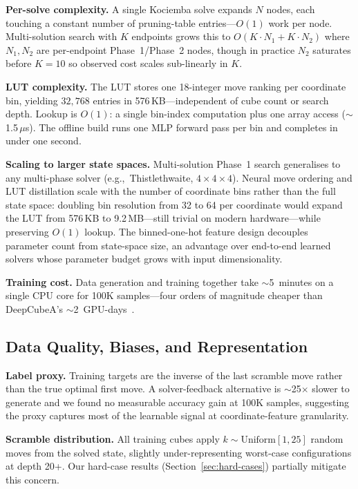 \documentclass[graybox]{svmult}
\begin{document}
\textbf{Per-solve complexity.} A single Kociemba solve expands $N$ nodes, each touching a constant number of pruning-table entries---$O(1)$ work per node. Multi-solution search with $K$ endpoints grows this to $O(K \cdot N_1 + K \cdot N_2)$ where $N_1,N_2$ are per-endpoint Phase~1/Phase~2 nodes, though in practice $N_2$ saturates before $K{=}10$ so observed cost scales sub-linearly in $K$.

\textbf{LUT complexity.} The LUT stores one 18-integer move ranking per coordinate bin, yielding $32{,}768$ entries in 576\,KB---independent of cube count or search depth. Lookup is $O(1)$: a single bin-index computation plus one array access ($\sim$1.5\,$\mu$s). The offline build runs one MLP forward pass per bin and completes in under one second.

\textbf{Scaling to larger state spaces.} Multi-solution Phase~1 search generalises to any multi-phase solver (e.g.,\ Thistlethwaite, $4{\times}4{\times}4$). Neural move ordering and LUT distillation scale with the number of coordinate bins rather than the full state space: doubling bin resolution from 32 to 64 per coordinate would expand the LUT from 576\,KB to 9.2\,MB---still trivial on modern hardware---while preserving $O(1)$ lookup. The binned-one-hot feature design decouples parameter count from state-space size, an advantage over end-to-end learned solvers whose parameter budget grows with input dimensionality.

\textbf{Training cost.} Data generation and training together take $\sim$5~minutes on a single CPU core for 100K samples---four orders of magnitude cheaper than DeepCubeA's $\sim$2~GPU-days~\cite{deepcubea}.

\subsection{Data Quality, Biases, and Representation}
\label{sec:data-quality}

\textbf{Label proxy.} Training targets are the inverse of the last scramble move rather than the true optimal first move. A solver-feedback alternative is $\sim$25$\times$ slower to generate and we found no measurable accuracy gain at 100K samples, suggesting the proxy captures most of the learnable signal at coordinate-feature granularity.

\textbf{Scramble distribution.} All training cubes apply $k \sim \text{Uniform}[1,25]$ random moves from the solved state, slightly under-representing worst-case configurations at depth 20+. Our hard-case results (Section~\ref{sec:hard-cases}) partially mitigate this concern.
\end{document}
